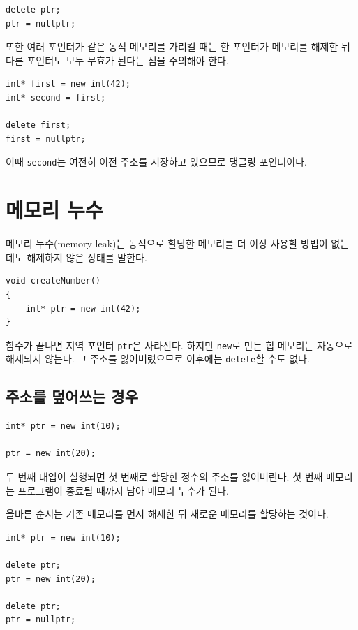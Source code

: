 \documentclass[11pt,a4paper]{article}
\begin{document}
\begin{lstlisting}
delete ptr;
ptr = nullptr;
\end{lstlisting}

또한 여러 포인터가 같은 동적 메모리를 가리킬 때는 한 포인터가 메모리를 해제한 뒤 다른 포인터도 모두 무효가 된다는 점을 주의해야 한다.

\begin{lstlisting}
int* first = new int(42);
int* second = first;

delete first;
first = nullptr;
\end{lstlisting}

이때 \texttt{second}는 여전히 이전 주소를 저장하고 있으므로 댕글링 포인터이다.

\section{메모리 누수}

메모리 누수(memory leak)는 동적으로 할당한 메모리를 더 이상 사용할 방법이 없는데도 해제하지 않은 상태를 말한다.

\begin{lstlisting}
void createNumber()
{
    int* ptr = new int(42);
}
\end{lstlisting}

함수가 끝나면 지역 포인터 \texttt{ptr}은 사라진다.
하지만 \texttt{new}로 만든 힙 메모리는 자동으로 해제되지 않는다.
그 주소를 잃어버렸으므로 이후에는 \texttt{delete}할 수도 없다.

\subsection{주소를 덮어쓰는 경우}

\begin{lstlisting}
int* ptr = new int(10);

ptr = new int(20);
\end{lstlisting}

두 번째 대입이 실행되면 첫 번째로 할당한 정수의 주소를 잃어버린다.
첫 번째 메모리는 프로그램이 종료될 때까지 남아 메모리 누수가 된다.

올바른 순서는 기존 메모리를 먼저 해제한 뒤 새로운 메모리를 할당하는 것이다.

\begin{lstlisting}
int* ptr = new int(10);

delete ptr;
ptr = new int(20);

delete ptr;
ptr = nullptr;
\end{lstlisting}
\end{document}
